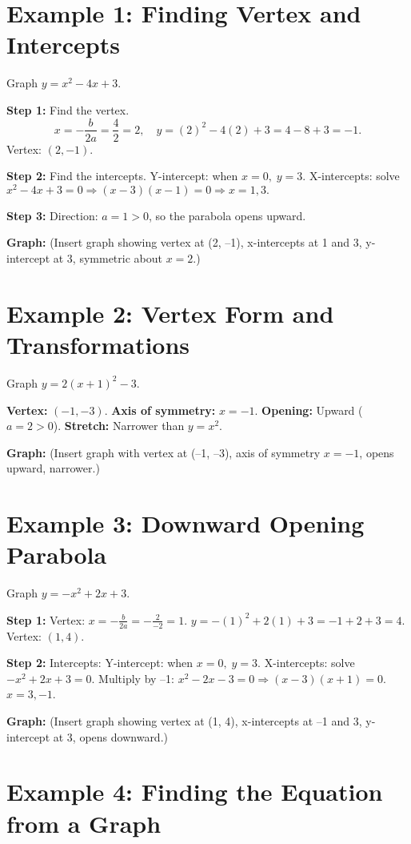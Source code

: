 \documentclass[12pt]{article}
\begin{document}
\section*{Example 1: Finding Vertex and Intercepts}

Graph \(y = x^2 - 4x + 3.\)

\textbf{Step 1:} Find the vertex.  
\[
x = -\frac{b}{2a} = \frac{4}{2} = 2, \quad y = (2)^2 - 4(2) + 3 = 4 - 8 + 3 = -1.
\]
Vertex: \((2, -1)\).

\textbf{Step 2:} Find the intercepts.  
Y-intercept: when \(x = 0,\; y = 3.\)  
X-intercepts: solve \(x^2 - 4x + 3 = 0 \Rightarrow (x - 3)(x - 1) = 0 \Rightarrow x = 1, 3.\)

\textbf{Step 3:} Direction: \(a = 1 > 0\), so the parabola opens upward.

\textbf{Graph:} (Insert graph showing vertex at (2, –1), x-intercepts at 1 and 3, y-intercept at 3, symmetric about \(x = 2\).)

\section*{Example 2: Vertex Form and Transformations}

Graph \(y = 2(x + 1)^2 - 3.\)

\textbf{Vertex:} \((-1, -3)\).  
\textbf{Axis of symmetry:} \(x = -1.\)  
\textbf{Opening:} Upward (\(a = 2 > 0\)).  
\textbf{Stretch:} Narrower than \(y = x^2.\)

\textbf{Graph:} (Insert graph with vertex at (–1, –3), axis of symmetry \(x = -1\), opens upward, narrower.)

\section*{Example 3: Downward Opening Parabola}

Graph \(y = -x^2 + 2x + 3.\)

\textbf{Step 1:} Vertex: \(x = -\frac{b}{2a} = -\frac{2}{-2} = 1.\)  
\(y = -(1)^2 + 2(1) + 3 = -1 + 2 + 3 = 4.\)  
Vertex: \((1, 4)\).

\textbf{Step 2:} Intercepts:  
Y-intercept: when \(x = 0,\; y = 3.\)  
X-intercepts: solve \(-x^2 + 2x + 3 = 0\).  
Multiply by –1: \(x^2 - 2x - 3 = 0 \Rightarrow (x - 3)(x + 1) = 0.\)  
\(\boxed{x = 3, -1}\).

\textbf{Graph:} (Insert graph showing vertex at (1, 4), x-intercepts at –1 and 3, y-intercept at 3, opens downward.)

\section*{Example 4: Finding the Equation from a Graph}
\end{document}
